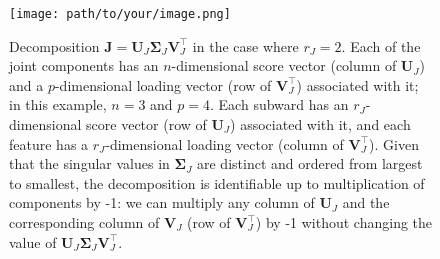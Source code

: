 \documentclass{article}
\begin{document}
\begin{figure}[h]
    \centering
    \texttt{[image: path/to/your/image.png]}
    \caption{Decomposition $\boldsymbol{J} = \boldsymbol{U}_J \boldsymbol{\Sigma}_J \boldsymbol{V}_J^\top$ in the case where $r_J = 2$. Each of the joint components has an $n$-dimensional score vector (column of $\boldsymbol{U}_J$) and a $p$-dimensional loading vector (row of $\boldsymbol{V}_J^\top$) associated with it; in this example, $n = 3$ and $p = 4$. Each subward has an $r_J$-dimensional score vector (row of $\boldsymbol{U}_J$) associated with it, and each feature has a $r_J$-dimensional loading vector (column of $\boldsymbol{V}_J^\top$). Given that the singular values in $\boldsymbol{\Sigma}_J$ are distinct and ordered from largest to smallest, the decomposition is identifiable up to multiplication of components by -1: we can multiply any column of $\boldsymbol{U}_J$ and the corresponding column of $\boldsymbol{V}_J$ (row of $\boldsymbol{V}_J^\top$) by -1 without changing the value of $\boldsymbol{U}_J \boldsymbol{\Sigma}_J \boldsymbol{V}_J^\top$.}
    \label{fig:decomposition_example}
\end{figure}
\end{document}
